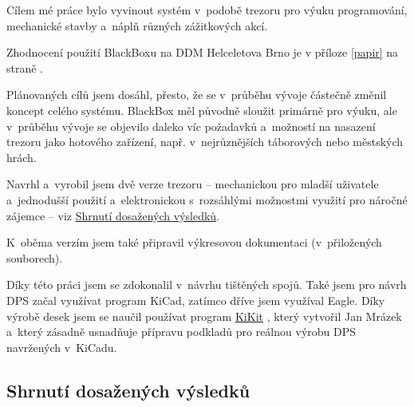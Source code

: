 Cílem mé práce bylo vyvinout systém v~podobě trezoru pro výuku programování, mechanické stavby 
a~náplň různých zážitkových akcí. 

Zhodnocení použití BlackBoxu na DDM Helceletova Brno je v příloze \ref{papir} na straně \pageref{papir}. 

Plánovaných cílů jsem dosáhl, přesto, že se v~průběhu vývoje částečně změnil koncept celého systému. 
BlackBox měl původně sloužit primárně pro výuku, ale v~průběhu vývoje 
se objevilo daleko víc požadavků a~možností na nasazení trezoru jako hotového zařízení, např. v~nejrůznějších 
táborových nebo městských hrách. 

Navrhl a~vyrobil jsem dvě verze trezoru -- mechanickou pro mladší uživatele
a~jednodušší použití a~elektronickou s~rozsáhlými možnostmi využití pro 
náročné zájemce -- viz \hyperref[shrnuti_vysledky]{Shrnutí dosažených výsledků}.

K~oběma verzím jsem také připravil výkresovou dokumentaci (v~přilo\-že\-ných souborech).


Díky této práci jsem se zdokonalil v~návrhu tištěných spojů. Také jsem pro návrh DPS začal využívat program KiCad, 
zatímco dříve jsem využíval Eagle.
Díky výrobě desek jsem se naučil používat program \href{https://github.com/yaqwsx/KiKit}{KiKit} \parencite{KiKit}, 
který vytvořil Jan Mrázek a~který zásadně usnadňuje přípravu podkladů pro reálnou výrobu DPS navržených v~KiCadu.

\subsection*{Shrnutí dosažených výsledků} \label{shrnuti_vysledky}

